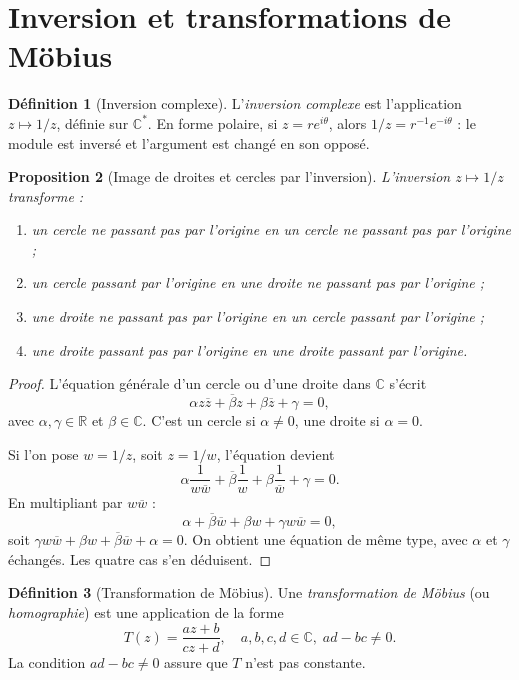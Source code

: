 \documentclass[12pt,a4paper,openany]{book}
\theoremstyle{definition}
\newtheorem{definition}{Définition}[chapter]
\theoremstyle{plain}
\newtheorem{proposition}[definition]{Proposition}
\theoremstyle{remark}
\newcommand{\C}{\mathbb{C}}
\newcommand{\R}{\mathbb{R}}
\newcommand{\conj}[1]{\overline{#1}}
\begin{document}
\section{Inversion et transformations de Möbius}\label{sec:mobius}

\begin{definition}[Inversion complexe]\label{def:inversion}
L'\emph{inversion complexe} est l'application $z \mapsto 1/z$, définie sur $\C^*$. En forme polaire, si $z = re^{i\theta}$, alors $1/z = r^{-1}e^{-i\theta}$ : le module est inversé et l'argument est changé en son opposé.
\end{definition}

\begin{proposition}[Image de droites et cercles par l'inversion]\label{prop:inversion-images}
L'inversion $z \mapsto 1/z$ transforme :
\begin{enumerate}[label=(\roman*)]
  \item un cercle ne passant pas par l'origine en un cercle ne passant pas par l'origine ;
  \item un cercle passant par l'origine en une droite ne passant pas par l'origine ;
  \item une droite ne passant pas par l'origine en un cercle passant par l'origine ;
  \item une droite passant pas par l'origine en une droite passant par l'origine.
\end{enumerate}
\end{proposition}

\begin{proof}
L'équation générale d'un cercle ou d'une droite dans $\C$ s'écrit
\[
  \alpha z\conj{z} + \conj{\beta} z + \beta\conj{z} + \gamma = 0,
\]
avec $\alpha, \gamma \in \R$ et $\beta \in \C$. C'est un cercle si $\alpha \neq 0$, une droite si $\alpha = 0$.

Si l'on pose $w = 1/z$, soit $z = 1/w$, l'équation devient
\[
  \alpha \frac{1}{w\conj{w}} + \conj{\beta}\frac{1}{w} + \beta\frac{1}{\conj{w}} + \gamma = 0.
\]
En multipliant par $w\conj{w}$ :
\[
  \alpha + \conj{\beta}\conj{w} + \beta w + \gamma w\conj{w} = 0,
\]
soit $\gamma w\conj{w} + \beta w + \conj{\beta}\conj{w} + \alpha = 0$. On obtient une équation de même type, avec $\alpha$ et $\gamma$ échangés. Les quatre cas s'en déduisent.
\end{proof}

\begin{definition}[Transformation de Möbius]\label{def:mobius}
Une \emph{transformation de Möbius} (ou \emph{homographie}) est une application de la forme
\[
  T(z) = \frac{az + b}{cz + d}, \quad a,b,c,d \in \C,\; ad - bc \neq 0.
\]
La condition $ad - bc \neq 0$ assure que $T$ n'est pas constante.
\end{definition}
\end{document}
